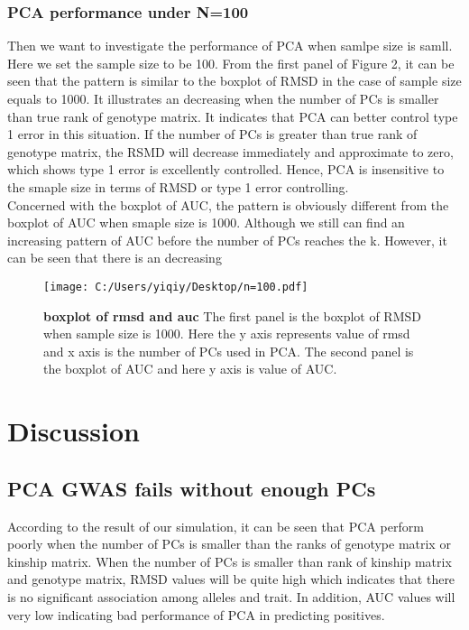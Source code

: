 \documentclass[12pt]{article}
\begin{document}
\subsubsection{PCA performance under N=100}

Then we want to investigate the performance of PCA when samlpe size is samll. Here we set the sample size to be 100. From the first panel of Figure 2, it can be seen that the pattern is similar to the boxplot of RMSD in the case of sample size equals to 1000. It illustrates an decreasing when the number of PCs is smaller than true rank of genotype matrix. It indicates that PCA can better control type 1 error in this situation. If the number of PCs is greater than true rank of genotype matrix, the RSMD will decrease immediately and approximate to zero, which shows type 1 error is excellently controlled. Hence, PCA is insensitive to the smaple size in terms of RMSD or type 1 error controlling. \\

Concerned with the boxplot of AUC, the pattern is obviously different from the boxplot of AUC when smaple size is 1000. Although we still can find an increasing pattern of AUC before the number of PCs reaches the k. However, it can be seen that there is an decreasing  
\begin{figure}[bp!]
  \centering
  \texttt{[image: C:/Users/yiqiy/Desktop/n=100.pdf]}
  \caption{
    {\bf boxplot of rmsd and auc}
    The first panel is the boxplot of RMSD when sample size is 1000. Here the y axis represents value of rmsd and x axis is the number of PCs used in PCA.
    The second panel is the boxplot of AUC and here y axis is value of AUC.}
  \label{fig:example}
\end{figure}




\section{Discussion}
\subsection{PCA GWAS fails without enough PCs}
According to the result of our simulation, it can be seen that PCA perform poorly when the number of PCs is smaller than the ranks of genotype matrix or kinship matrix. When the number of PCs is smaller than rank of kinship matrix and genotype matrix, RMSD values will be quite high which indicates that there is no significant association among alleles and trait. In addition, AUC values will very low indicating bad performance of PCA in predicting positives. 
\end{document}
